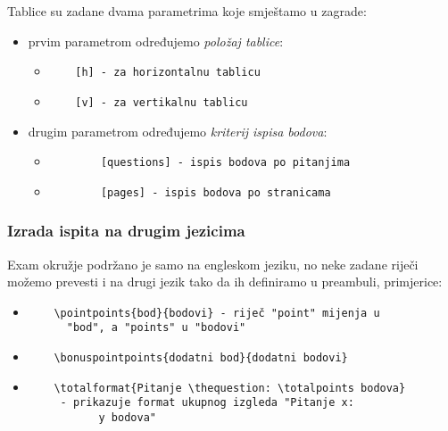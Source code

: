 \documentclass{beamer}
\begin{document}
\begin{frame}[fragile]
Tablice su zadane dvama parametrima koje smještamo u zagrade:
\begin{itemize}
\item prvim parametrom određujemo \emph{položaj tablice}:
	\begin{itemize}
	\item 
	\begin{verbatim}
	[h] - za horizontalnu tablicu
	\end{verbatim}
	\item 
	\begin{verbatim}
	[v] - za vertikalnu tablicu
	\end{verbatim}
	\end{itemize}

\item drugim parametrom određujemo \emph{kriterij ispisa bodova}:
	\begin{itemize}
	\item
		\begin{verbatim}
		[questions] - ispis bodova po pitanjima
		\end{verbatim}
	\item
		\begin{verbatim}
		[pages] - ispis bodova po stranicama
		\end{verbatim} 
	\end{itemize}
\end{itemize}
\end{frame}

\begin{frame}[fragile]
\frametitle{Izrada ispita na drugim jezicima}
Exam okružje podržano je samo na engleskom jeziku, no neke zadane riječi možemo prevesti i na drugi jezik tako da ih definiramo u preambuli, primjerice:
\begin{itemize}
\item
	\begin{verbatim}
	\pointpoints{bod}{bodovi} - riječ "point" mijenja u 
      "bod", a "points" u "bodovi"
	\end{verbatim}
\item
	\begin{verbatim}
	\bonuspointpoints{dodatni bod}{dodatni bodovi}
	\end{verbatim}
\item
	\begin{verbatim}
	\totalformat{Pitanje \thequestion: \totalpoints bodova} 
     - prikazuje format ukupnog izgleda "Pitanje x:
	       y bodova"
	\end{verbatim}
\end{itemize}
\end{frame}
\end{document}
